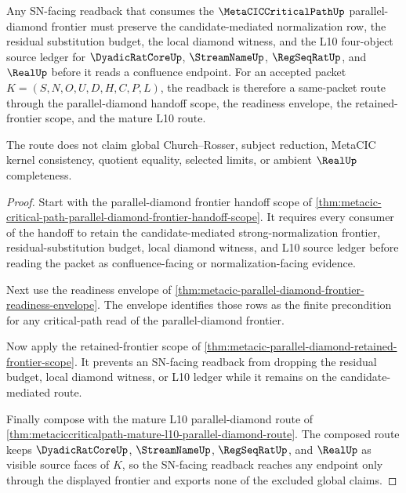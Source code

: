 \begin{theorem}
\label{thm:metacic-parallel-diamond-candidate-mediated-sn-readback}
Any SN-facing readback that consumes the $\MetaCICCriticalPathUp$ parallel-diamond frontier must preserve the candidate-mediated normalization row, the residual substitution budget, the local diamond witness, and the L10 four-object source ledger for $\DyadicRatCoreUp$, $\StreamNameUp$, $\RegSeqRatUp$, and $\RealUp$ before it reads a confluence endpoint. For an accepted packet $K=(S,N,O,U,D,H,C,P,L)$, the readback is therefore a same-packet route through the parallel-diamond handoff scope, the readiness envelope, the retained-frontier scope, and the mature L10 route.

The route does not claim global Church--Rosser, subject reduction, MetaCIC kernel consistency, quotient equality, selected limits, or ambient $\RealUp$ completeness.
\end{theorem}
\begin{proof}
Start with the parallel-diamond frontier handoff scope of \autoref{thm:metacic-critical-path-parallel-diamond-frontier-handoff-scope}. It requires every consumer of the handoff to retain the candidate-mediated strong-normalization frontier, residual-substitution budget, local diamond witness, and L10 source ledger before reading the packet as confluence-facing or normalization-facing evidence.

Next use the readiness envelope of \autoref{thm:metacic-parallel-diamond-frontier-readiness-envelope}. The envelope identifies those rows as the finite precondition for any critical-path read of the parallel-diamond frontier.

Now apply the retained-frontier scope of \autoref{thm:metacic-parallel-diamond-retained-frontier-scope}. It prevents an SN-facing readback from dropping the residual budget, local diamond witness, or L10 ledger while it remains on the candidate-mediated route.

Finally compose with the mature L10 parallel-diamond route of \autoref{thm:metaciccriticalpath-mature-l10-parallel-diamond-route}. The composed route keeps $\DyadicRatCoreUp$, $\StreamNameUp$, $\RegSeqRatUp$, and $\RealUp$ as visible source faces of $K$, so the SN-facing readback reaches any endpoint only through the displayed frontier and exports none of the excluded global claims.
\end{proof}
